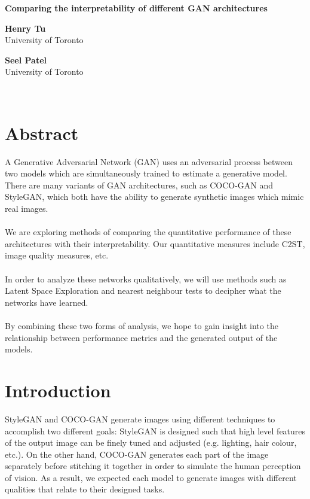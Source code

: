 \documentclass[12pt]{article}
\begin{document}
    \begin{center}
        \textbf{Comparing the interpretability of different GAN architectures}
    \end{center}
    \begin{minipage}{.5\textwidth}
        \centering
        \textbf{Henry Tu}\\
        University of Toronto
    \end{minipage}
    \begin{minipage}{.5\textwidth}
        \centering
        \textbf{Seel Patel}\\
        University of Toronto
    \end{minipage}
    \\

    \begin{multicols*}{2}
        \raggedcolumns

        \section{Abstract}
        \label{sec:abstract}
        A Generative Adversarial Network (GAN) uses an adversarial process between two models which are simultaneously trained to estimate a generative model.\cite{gan}
        There are many variants of GAN architectures, such as COCO-GAN\cite{cocogan} and StyleGAN\cite{stylegan}, which both have the ability to generate synthetic images which mimic real images.\\\\
        We are exploring methods of comparing the quantitative performance of these architectures with their interpretability.
        Our quantitative measures include C2ST\cite{evaluateGANs}, image quality measures\cite{evaluateGANs}, etc.\\\\
        In order to analyze these networks qualitatively, we will use methods such as Latent Space Exploration\cite{sampleGAN} and nearest neighbour tests\cite{evaluateGANs} to decipher what the networks have learned.\\\\
        By combining these two forms of analysis, we hope to gain insight into the relationship between performance metrics and the generated output of the models.

        \section{Introduction}
        \label{sec:introduction}
        StyleGAN and COCO-GAN generate images using different techniques to accomplish two different goals: StyleGAN is designed such that high level features of the output image can be finely tuned and adjusted (e.g. lighting, hair colour, etc.)\cite{stylegan}.
        On the other hand, COCO-GAN generates each part of the image separately before stitching it together in order to simulate the human perception of vision\cite{cocogan}.
        As a result, we expected each model to generate images with different qualities that relate to their designed tasks.

\end{multicols*}
\end{document}
